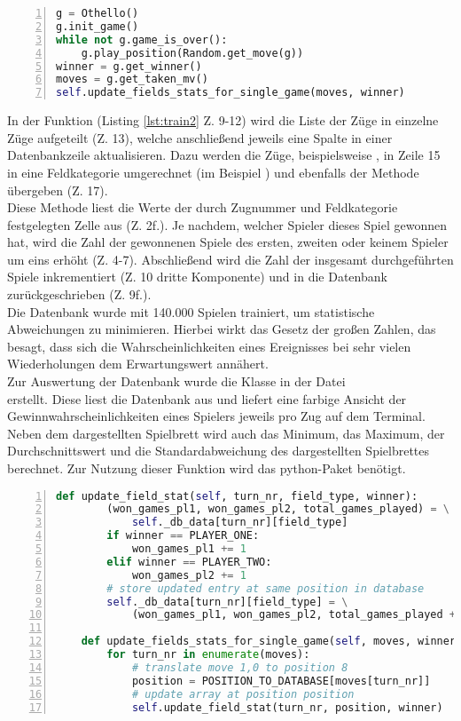 \begin{lstlisting}[basicstyle=\footnotesize, caption = {Befüllen der Datenbank 1}, language = python, captionpos = t , numbers=left, label={lst:train1}]
g = Othello()
g.init_game()
while not g.game_is_over():
	g.play_position(Random.get_move(g))
winner = g.get_winner()
moves = g.get_taken_mv()
self.update_fields_stats_for_single_game(moves, winner)
\end{lstlisting}
In der Funktion  (Listing \ref{lst:train2} Z. 9-12) wird die Liste der Züge in einzelne Züge aufgeteilt (Z. 13), welche anschließend jeweils eine Spalte in einer Datenbankzeile aktualisieren. Dazu werden die Züge, beispielsweise , in Zeile 15 in eine Feldkategorie umgerechnet (im Beispiel ) und ebenfalls der Methode  übergeben (Z. 17).
\\Diese Methode liest die Werte der durch Zugnummer und Feldkategorie festgelegten Zelle aus (Z. 2f.). Je nachdem, welcher Spieler dieses Spiel gewonnen hat, wird die Zahl der gewonnenen Spiele des ersten, zweiten oder keinem Spieler um eins erhöht (Z. 4-7). Abschließend wird die Zahl der insgesamt durchgeführten Spiele inkrementiert (Z. 10 dritte Komponente) und in die Datenbank zurückgeschrieben (Z. 9f.).
\\Die Datenbank wurde mit 140.000 Spielen trainiert, um statistische Abweichungen zu minimieren. Hierbei wirkt das Gesetz der großen Zahlen, das besagt, dass sich die Wahrscheinlichkeiten eines Ereignisses bei sehr vielen Wiederholungen dem Erwartungswert annähert.
\\Zur Auswertung der Datenbank wurde die Klasse  in der Datei \\ erstellt. Diese liest die Datenbank aus und liefert eine farbige Ansicht der Gewinnwahrscheinlichkeiten eines Spielers jeweils pro Zug auf dem Terminal. Neben dem dargestellten Spielbrett wird auch das Minimum, das Maximum, der Durchschnittswert und die Standardabweichung des dargestellten Spielbrettes berechnet. Zur Nutzung dieser Funktion wird das python-Paket  benötigt.
\newpage
\begin{lstlisting}[basicstyle=\footnotesize, caption = {Befüllen der Datenbank 2}, language = python, captionpos = t , numbers=left, label={lst:train2}]
	    def update_field_stat(self, turn_nr, field_type, winner):
        (won_games_pl1, won_games_pl2, total_games_played) = \
        	self._db_data[turn_nr][field_type]
        if winner == PLAYER_ONE:
            won_games_pl1 += 1
        elif winner == PLAYER_TWO:
            won_games_pl2 += 1
        # store updated entry at same position in database
        self._db_data[turn_nr][field_type] = \
        	(won_games_pl1, won_games_pl2, total_games_played + 1)

    def update_fields_stats_for_single_game(self, moves, winner):
        for turn_nr in enumerate(moves):
            # translate move 1,0 to position 8
            position = POSITION_TO_DATABASE[moves[turn_nr]]
            # update array at position position
            self.update_field_stat(turn_nr, position, winner)
\end{lstlisting}

